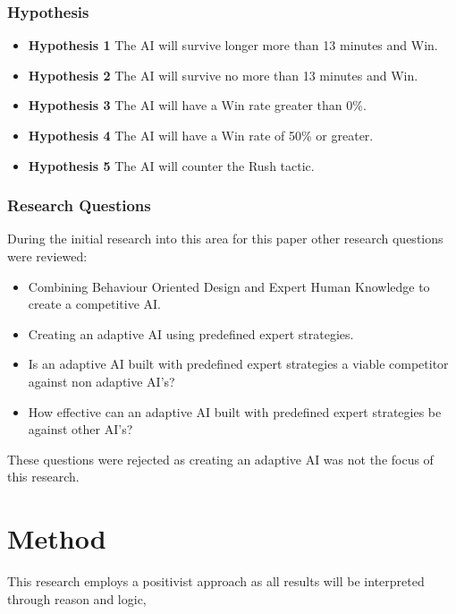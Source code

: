 \documentclass[journal]{IEEEtran}
\begin{document}
\subsubsection{Hypothesis}
\begin{itemize}
	\item \textbf{Hypothesis 1} The AI will survive longer more than 13 minutes and Win.
	\item \textbf{Hypothesis 2} The AI will survive no more than 13 minutes and Win.
	\item \textbf{Hypothesis 3} The AI will have a Win rate greater than 0\%.
	\item \textbf{Hypothesis 4} The AI will have a Win rate of 50\% or greater.	
	\item \textbf{Hypothesis 5} The AI will counter the Rush tactic.
\end{itemize}

\subsubsection{Research Questions}
During the initial research into this area for this paper other research questions were reviewed:
\begin{itemize}
	\item Combining Behaviour Oriented Design and Expert Human Knowledge to create a competitive AI.
	
	\item Creating an adaptive AI using predefined expert strategies. 
	
	\item Is an adaptive AI built with predefined expert strategies a viable competitor against non adaptive AI’s?
	
	\item How effective can an adaptive AI built with predefined expert strategies be against other AI’s?	
\end{itemize}
These questions were rejected as creating an adaptive AI was not the focus of this research.
\newline

\section{Method}


This research employs a positivist approach as all results will be interpreted through reason and logic, 
\end{document}

